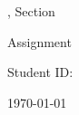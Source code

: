 \ifx\CROWDMARK\undefined

\ifx\assignmenttitle\undefined
\newcommand{\assignmenttitle}{Assignment \assignmentnum}
\fi
\begin{titlepage}
\centering

\vspace*{2.5cm}
        
{\Large \coursename
\ifdefined\coursesec
, Section \coursesec
\fi
\vspace{0.5cm}

\assignmenttitle}

\vspace{3.5cm}
        
\textit{\studentname}

\vspace{.5cm}

Student ID: \studentid
\vspace{3.5cm}

\today

\end{titlepage}
   
\fi